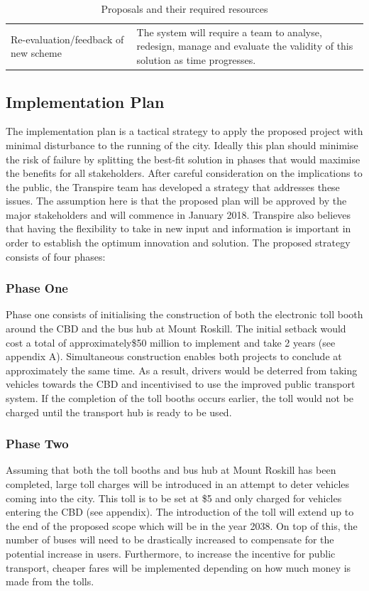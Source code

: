 \documentclass[twoside, a4paper, 11pt]{article}
\begin{document}
\begin{table}[H]
\begin{tabular}{|p{6cm}|p{7cm}|}
			Re-evaluation/feedback of new scheme                                     & The system will require a team to analyse, redesign, manage and evaluate the validity of this solution as time progresses.                                                                      \\
                                                                                                  
		\end{tabular}
		\caption{Proposals and their required resources}
	\label{bitch}
	\end{table}
\subsection{Implementation Plan}
The implementation plan is a tactical strategy to apply the proposed project with minimal disturbance to the running of the city. Ideally this plan should minimise the risk of failure by splitting the best-fit solution in phases that would maximise the benefits for all stakeholders. After careful consideration on the implications to the public, the Transpire team has developed a strategy that addresses these issues. The assumption here is that the proposed plan will be approved by the major stakeholders and will commence in January 2018. Transpire also believes that having the flexibility to take in new input and information is important in order to establish the optimum innovation and solution. The proposed strategy consists of four phases:
\subsubsection{Phase One}
Phase one consists of initialising the construction of both the electronic toll booth around the CBD and the bus hub at Mount Roskill. The initial setback would cost a total of approximately\$50 million to implement and take 2 years (see appendix A). Simultaneous construction enables both projects to conclude at approximately the same time. As a result, drivers would be deterred from taking vehicles towards the CBD and incentivised to use the improved public transport system. If the completion of the toll booths occurs earlier, the toll would not be charged until the transport hub is ready to be used.
\subsubsection{Phase Two}
Assuming that both the toll booths and bus hub at Mount Roskill has been completed, large toll charges will be introduced in an attempt to deter vehicles coming into the city. This toll is to be set at \$5 and only charged for vehicles entering the CBD (see appendix). The introduction of the toll will extend up to the end of the proposed scope which will be in the year 2038. On top of this, the number of buses will need to be drastically increased to compensate for the potential increase in users. Furthermore, to increase the incentive for public transport, cheaper fares will be implemented depending on how much money is made from the tolls.
\end{document}
